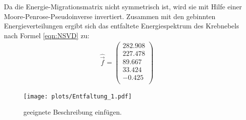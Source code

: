 Da die Energie-Migrationsmatrix nicht symmetrisch ist, wird sie mit Hilfe einer Moore-Penrose-Pseudoinverse invertiert. Zusammen mit den gebinnten Energieverteilungen ergibt sich das entfaltete Energiespektrum des Krebnebels nach Formel \eqref{eqn:NSVD} zu:
\begin{align}
	\hat{\vec{f}} = \begin{pmatrix}
			282.908\\
			227.478\\
			89.667\\
			33.424\\
			-0.425\\
	\end{pmatrix}
\end{align}
\begin{figure}
  \centering
  \texttt{[image: plots/Entfaltung\_1.pdf]}
  \caption{geeignete Beschreibung einfügen.}
  \label{fig:E1}
\end{figure}
